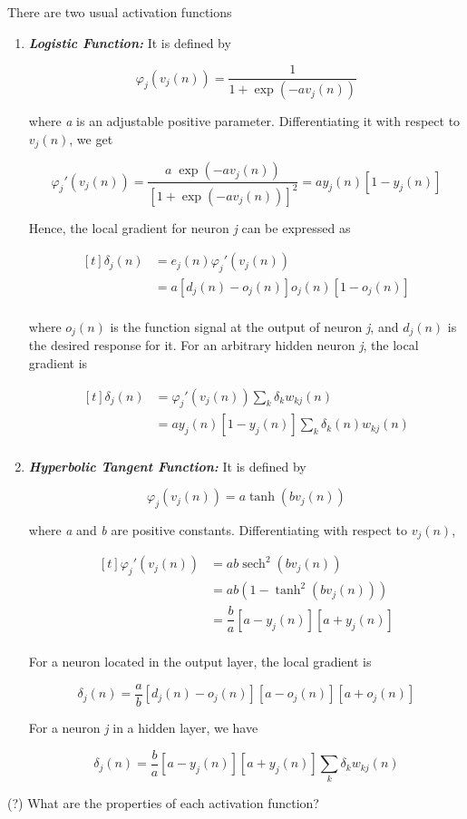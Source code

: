 \documentclass[twocolumn]{article}
\DeclareMathOperator{\sech}{sech}
\begin{document}
There are two usual activation functions

\begin{enumerate}
	\item \textit{ \textbf{Logistic Function:}} It is defined by

		$$ \varphi_{j} (v_{j} (n)) = \dfrac{1}{1 + \exp (-av_{j} (n))} $$

		\noindent where \textit{a} is an adjustable positive parameter. Differentiating it with respect to $ v_{j} (n) $, we get

		$$ \varphi_{j}' (v_{j} (n)) = \dfrac{a\;\exp (-a v_{j} (n))}{ [1 + \exp (-a v_{j} (n))]^{2}} = a y_{j} (n) [1 - y_{j} (n)]$$

		Hence, the local gradient for neuron \textit{j} can be expressed as

		$$ \begin{aligned}[t]
			\delta_{j} (n) &= e_{j} (n) \varphi_{j}' (v_{j} (n))\\
				       &= a [d_{j} (n) - o_{j} (n)]o_{j} (n) [1 - o_{j} (n)] \\
		\end{aligned} $$

		\noindent where $ o_{j} (n) $ is the function signal at the output of neuron \textit{j}, and $ d_{j} (n) $ is the desired response for it. For an arbitrary hidden neuron \textit{j}, the local gradient is

		$$ \begin{aligned}[t]
			\delta_{j} (n) &= \varphi_{j}' (v_{j} (n)) \sum_{k} \delta_{k} w_{kj} (n)\\
				       &= a y_{j} (n) [1 - y_{j} (n)]\sum_{k} \delta_{k} (n)w_{kj} (n)\\
		\end{aligned} $$

	\item \textit{ \textbf{Hyperbolic Tangent Function:}} It is defined by

		$$ \varphi _{j} (v_{j} (n)) = a \tanh (b v_{j} (n)) $$

		\noindent where \textit{a} and \textit{b} are positive constants. Differentiating with respect to $ v_{j} (n) $,

		$$ \begin{aligned}[t]
			\varphi_{j}' (v_{j} (n)) &= ab \sech^{2} (bv_{j} (n)) \\
						 &= ab (1 - \tanh^{2} (bv_{j} (n)))\\
						 &= \dfrac{b}{a} [a - y_{j} (n)] [a + y_{j} (n)]\\
		\end{aligned} $$

		For a neuron located in the output layer, the local gradient is

		$$ \delta_{j} (n) = \dfrac{a}{b} [d_{j} (n) - o_{j} (n)] [a - o_{j} (n)] [a + o_{j} (n)] $$

		For a neuron \textit{j} in a hidden layer, we have

		$$ \delta_{j} (n) = \dfrac{b}{a} [a - y_{j} (n)] [a + y_{j} (n)]\sum_{k} \delta_{k} w_{kj} (n)  $$
\end{enumerate}

\noindent (?) What are the properties of each activation function?
\end{document}
